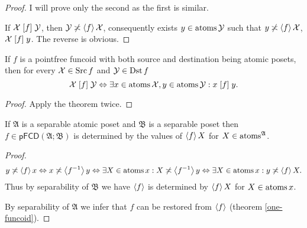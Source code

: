 \begin{proof}
I will prove only the second as the first is similar.

If $\mathcal{X}\mathrel{\left[f\right]}\mathcal{Y}$, then $\mathcal{Y}\not\asymp\left\langle f\right\rangle\mathcal{X}$,
consequently exists $y\in\operatorname{atoms}\mathcal{Y}$ such that $y\not\asymp\left\langle f\right\rangle\mathcal{X}$,
$\mathcal{X}\mathrel{\left[f\right]}y$. The reverse is obvious.\end{proof}
\begin{cor}
\label{pf-suprel-atoms}If $f$ is a pointfree funcoid with both source
and destination being atomic posets, then for every $\mathcal{X}\in\operatorname{Src} f$
and $\mathcal{Y}\in\operatorname{Dst} f$
\[
\mathcal{X}\mathrel{\left[f\right]}\mathcal{Y}\Leftrightarrow\exists x\in\operatorname{atoms}\mathcal{X},y\in\operatorname{atoms}\mathcal{Y}:x\mathrel{\left[f\right]}y.
\]
\end{cor}
\begin{proof}
Apply the theorem twice.\end{proof}
\begin{cor}
If $\mathfrak{A}$ is a separable atomic poset and $\mathfrak{B}$
is a separable poset then $f\in\mathsf{pFCD}(\mathfrak{A};\mathfrak{B})$
is determined by the values of $\left\langle f\right\rangle X$ for $X\in\operatorname{atoms}^{\mathfrak{A}}$.\end{cor}
\begin{proof}
~
\[
y\not\asymp\left\langle f\right\rangle x\Leftrightarrow x\not\asymp\left\langle f^{-1}\right\rangle y\Leftrightarrow\exists X\in\operatorname{atoms} x:X\not\asymp\left\langle f^{-1}\right\rangle y\Leftrightarrow\exists X\in\operatorname{atoms} x:y\not\asymp\left\langle f\right\rangle X.
\]
Thus by separability of $\mathfrak{B}$ we have $\left\langle f\right\rangle$ is determined
by $\left\langle f\right\rangle X$ for $X\in\operatorname{atoms} x$.

By separability of $\mathfrak{A}$ we infer that $f$ can be restored
from $\left\langle f\right\rangle$ (theorem \ref{one-funcoid}).\end{proof}
